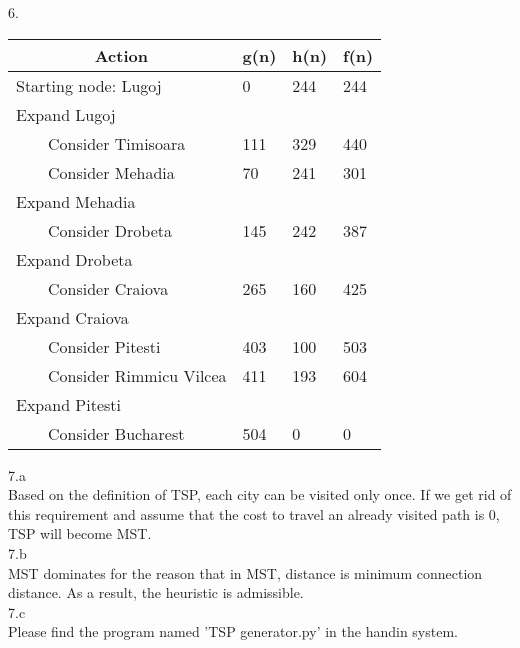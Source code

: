 \documentclass[a4paper]{article}
\begin{document}
6.\\
\begin{table}[!htb]
\centering
\begin{tabular}{llll}
\multicolumn{1}{|c|}{\textbf{Action}} & \multicolumn{1}{c|}{\textbf{g(n)}} & \multicolumn{1}{c|}{\textbf{h(n)}} & \multicolumn{1}{c|}{\textbf{f(n)}} \\ \hline
Starting node: Lugoj    & 0    & 244  & 244  \\
Expand Lugoj            &      &      &      \\
\ \ \ \ Consider Timisoara      & 111  & 329  & 440  \\
\ \ \ \ Consider Mehadia        & 70   & 241  & 301  \\
Expand Mehadia          &      &      &      \\
\ \ \ \ Consider Drobeta        & 145  & 242  & 387  \\
Expand Drobeta          &      &      &      \\
\ \ \ \ Consider Craiova        & 265  & 160  & 425  \\
Expand Craiova          &      &      &      \\
\ \ \ \ Consider Pitesti        & 403  & 100  & 503  \\
\ \ \ \ Consider Rimmicu Vilcea & 411  & 193  & 604  \\
Expand Pitesti          &      &      &      \\
\ \ \ \ Consider Bucharest               & 504  & 0    & 0    \\
\end{tabular}
\end{table}

7.a\\
Based on the definition of TSP, each city can be visited only once. If we get rid of this requirement and assume that the cost to travel an already visited path is 0, TSP will become MST.\\

7.b\\
MST dominates for the reason that in MST, distance is minimum connection distance. As a result, the heuristic is admissible.\\

7.c\\
Please find the program named 'TSP generator.py' in the handin system. \\
\end{document}
